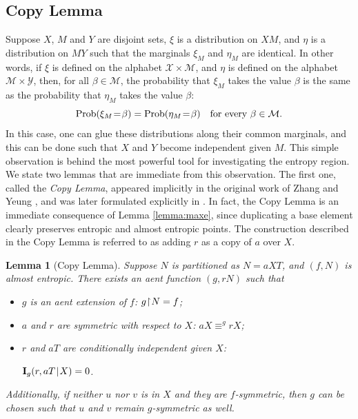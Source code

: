 \documentclass[10pt,a4paper]{amsart}
\def\|{\mskip1.5mu{|}\mskip1.5mu}
\def\I{\mathbf I}
\def\m#1{\mskip 1.5mu{#1}\mskip 1.5mu}
\newcommand\restr{\mkern1mu{\upharpoonright}\mkern1mu}
\DeclareMathOperator\Prob{\mathrm{Prob}}
\newtheorem{lemma}[theorem]{Lemma}
\begin{document}
\subsection{Copy Lemma}\label{subsec:copy}

Suppose $X$, $M$ and $Y$ are disjoint sets, $\xi$ is a distribution on $XM$,
and $\eta$ is a distribution on $MY$ such that the marginals $\xi_M$ and
$\eta_M$ are identical. In other words, if $\xi$ is defined on the alphabet
$\mathcal X\times\mathcal M$, and $\eta$ is defined on the alphabet
$\mathcal M\times\mathcal Y$, then, for all $\beta\in\mathcal M$, the
probability that $\xi_M$ takes the value $\beta$ is the same as the
probability that $\eta_M$ takes the value $\beta$:
$$
   \Prob(\xi_M\m=\beta)=\Prob(\eta_M\m=\beta) ~~\mbox{ for every }
   \beta\in\mathcal M.
$$
In this case, one can glue these distributions along their common marginals,
and this can be done such that $X$ and $Y$ become independent given $M$. This
simple observation is behind the most powerful tool for investigating the
entropy region. We state two lemmas that are immediate from this observation.
The first one, called the \emph{Copy Lemma}, appeared implicitly in the
original work of Zhang and Yeung \cite{ZhY.conic, ZhY.ineq}, and was later
formulated explicitly in \cite{DFZ11}. In fact, the Copy Lemma is an
immediate consequence of Lemma \ref{lemma:maxe}, since duplicating a base
element clearly preserves entropic and almost entropic points. The
construction described in the Copy Lemma is referred to as adding $r$ as a copy
of $a$ over $X$.

\begin{lemma}[Copy Lemma]\label{lemma:copy}
Suppose $N$ is partitioned as $N=aXT$, and $(f,N)$ is almost entropic.
There exists an aent function $(g,rN)$ such that
\begin{itemize}
\item[a)] $g$ is an aent extension of $f$: $g\restr N=f$;
\item[b)] $a$ and $r$ are symmetric with respect to $X$: $aX\equiv^g rX$;
\item[c)] $r$ and $aT$ are conditionally independent
given $X$:

$\I_g(r,aT\|X)=0$.
\end{itemize}
Additionally, if neither $u$ nor $v$ is in $X$ and they are $f$-symmetric,
then $g$ can be chosen such that $u$ and $v$ remain $g$-symmetric as well.
\end{lemma}
\end{document}

